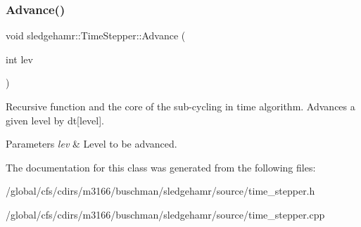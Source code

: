 \subsubsection{\texorpdfstring{Advance()}{Advance()}}
{\footnotesize\ttfamily void sledgehamr\+::\+Time\+Stepper\+::\+Advance (\begin{DoxyParamCaption}\item[{int}]{lev }\end{DoxyParamCaption})}



Recursive function and the core of the sub-\/cycling in time algorithm. Advances a given level by dt\mbox{[}level\mbox{]}. 


\begin{DoxyParams}{Parameters}
{\em lev} & Level to be advanced. \\
\hline
\end{DoxyParams}


The documentation for this class was generated from the following files\+:\begin{DoxyCompactItemize}
\item 
/global/cfs/cdirs/m3166/buschman/sledgehamr/source/time\+\_\+stepper.\+h\item 
/global/cfs/cdirs/m3166/buschman/sledgehamr/source/time\+\_\+stepper.\+cpp\end{DoxyCompactItemize}
